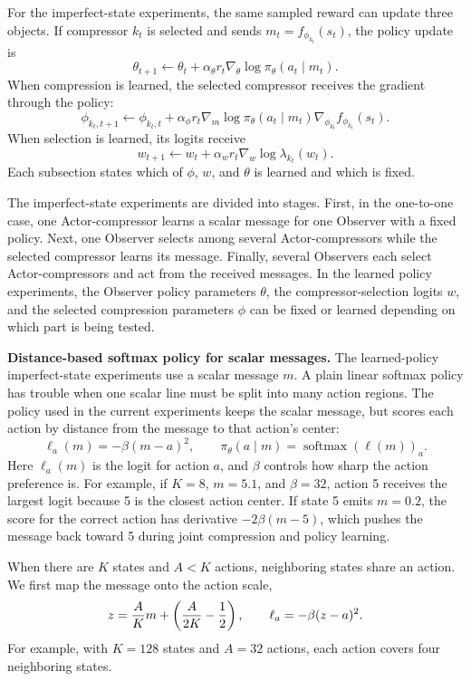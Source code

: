 \documentclass[11pt]{article}
\begin{document}
For the imperfect-state experiments, the same sampled reward can update three
objects. If compressor \(k_t\) is selected and sends
\(m_t=f_{\phi_{k_t}}(s_t)\), the policy update is
\[
  \theta_{t+1}
  \leftarrow
  \theta_t
  +\alpha_\theta r_t
  \nabla_\theta\log\pi_\theta(a_t\mid m_t).
\]
When compression is learned, the selected compressor receives the gradient
through the policy:
\[
  \phi_{k_t,t+1}
  \leftarrow
  \phi_{k_t,t}
  +\alpha_\phi r_t
  \nabla_m\log\pi_\theta(a_t\mid m_t)
  \nabla_{\phi_{k_t}}f_{\phi_{k_t}}(s_t).
\]
When selection is learned, its logits receive
\[
  w_{t+1}
  \leftarrow
  w_t+\alpha_w r_t\nabla_w\log\lambda_{k_t}(w_t).
\]
Each subsection states which of \(\phi\), \(w\), and \(\theta\) is learned and
which is fixed.

The imperfect-state experiments are divided into stages. First, in the one-to-one
case, one Actor-compressor learns a scalar message for one Observer with a
fixed policy. Next, one Observer selects among several Actor-compressors while
the selected compressor learns its message. Finally, several Observers each
select Actor-compressors and act from the received messages. In the learned
policy experiments, the Observer policy parameters \(\theta\), the
compressor-selection logits \(w\), and the selected compression parameters
\(\phi\) can be fixed or learned depending on which part is being tested.

\textbf{Distance-based softmax policy for scalar messages.}
The learned-policy imperfect-state experiments use a scalar message \(m\). A plain
linear softmax policy has trouble when one scalar line must be split into many
action regions. The policy used in the current experiments keeps the scalar message,
but scores each action by distance from the message to that action's center:
\[
  \ell_a(m)=-\beta(m-a)^2,\qquad
  \pi_\theta(a\mid m)=\operatorname{softmax}(\ell(m))_a .
\]
Here \(\ell_a(m)\) is the logit for action \(a\), and \(\beta\) controls how
sharp the action preference is. For example, if \(K=8\), \(m=5.1\), and
\(\beta=32\), action 5 receives the largest logit because 5 is the closest
action center. If state 5 emits \(m=0.2\), the score for the correct action has
derivative \(-2\beta(m-5)\), which pushes the message back toward 5 during joint
compression and policy learning.

When there are \(K\) states and \(A<K\) actions, neighboring states share an
action. We first map the message onto the action scale,
\[
  z={A\over K}m+\left({A\over 2K}-{1\over 2}\right),
  \qquad
  \ell_a=-\beta(z-a)^2.
\]
For example, with \(K=128\) states and \(A=32\) actions, each action covers four
neighboring states.
\end{document}
